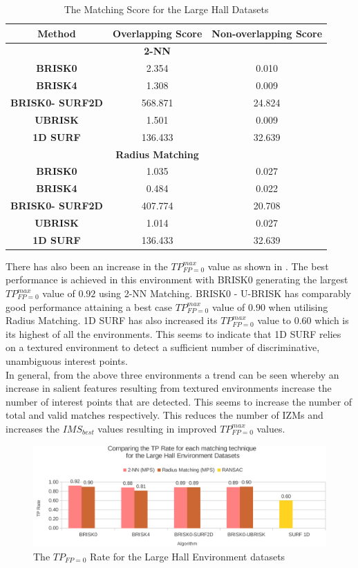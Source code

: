\begin{table}
\centering
\caption{The Matching Score for the Large Hall Datasets}
\begin{tabular}{|c|c|c|}
\hline 
\textbf{Method} & \textbf{Overlapping Score} & \textbf{Non-overlapping Score}\tabularnewline
\hline 
\hline 
 & \textbf{2-NN} & \tabularnewline
\hline 
\textbf{BRISK0} & 2.354 & 0.010\tabularnewline
\hline 
\textbf{BRISK4} & 1.308 & 0.009\tabularnewline
\hline 
\textbf{BRISK0- SURF2D} & 568.871 & 24.824\tabularnewline
\hline 
\textbf{UBRISK} & 1.501 & 0.009\tabularnewline
\hline 
\textbf{1D SURF} & 136.433 & 32.639\tabularnewline
\hline 
 & \textbf{Radius Matching} & \tabularnewline
\hline 
\textbf{BRISK0} & 1.035 & 0.027\tabularnewline
\hline 
\textbf{BRISK4} & 0.484 & 0.022\tabularnewline
\hline 
\textbf{BRISK0- SURF2D} & 407.774 & 20.708\tabularnewline
\hline 
\textbf{UBRISK} & 1.014 & 0.027\tabularnewline
\hline 
\textbf{1D SURF} & 136.433 & 32.639\tabularnewline
\hline 
\end{tabular}
\label{tab:lhMS}
\end{table}


There has also been an increase in the $TP_{FP=0}^{max}$ value as shown in . The best performance is achieved in this environment with BRISK0 generating the largest $TP_{FP=0}^{max}$ value of $0.92$ using 2-NN Matching. BRISK0 - U-BRISK has comparably good performance attaining a best case $TP_{FP=0}^{max}$ value of $0.90$ when utilising Radius Matching. 1D SURF has also increased its $TP_{FP=0}^{max}$ value to $0.60$ which is its highest of all the environments. This seems to indicate that 1D SURF relies on a textured environment to detect a sufficient number of discriminative, unambiguous interest points.\\

In general, from the above three environments a trend can be seen whereby an increase in salient features resulting from textured environments increase the number of interest points that are detected. This seems to increase the number of total and valid matches respectively. This reduces the number of IZMs and increases the $IMS_{best}$ values resulting in improved $TP_{FP=0}^{max}$ values.\\

\begin{figure}
  \centering
    \includegraphics[width=1.0\textwidth]{../Drawings/Graphs/tp_rate_lh.pdf}
    \caption{The $TP_{FP=0}$ Rate for the Large Hall Environment datasets} 
    \label{fig:tp_rate_lh}
\end{figure}


